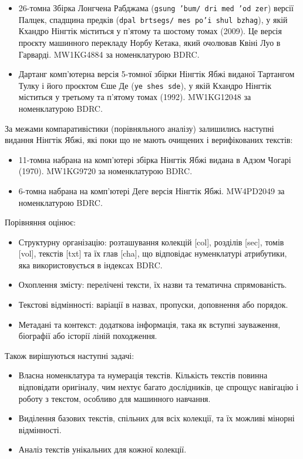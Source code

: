 \documentclass{article}
\begin{document}
\begingroup\raggedright
\begin{itemize}
\item 26-томна Збірка Лонгчена Рабджама (\texttt{gsung 'bum/ dri med 'od zer}) версії Палцек, спадщина предків (\texttt{dpal brtsegs/ mes po'i shul bzhag}),
      у якій Кхандро Нінгтік міститься у п'ятому та шостому томах (2009). Це версія проєкту машинного перекладу Норбу Кетака,
      який очолював Квіні Луо в Гарварді. MW1KG4884 за номенклатурою BDRC.
\item Дартанг комп'ютерна версія 5-томної збірки Нінгтік Ябжі виданої Тартангом Тулку і його проєктом Єше Де (\texttt{ye shes sde}),
      у якій Кхандро Нінгтік міститься у третьому та п'ятому томах (1992). MW1KG12048 за номенклатурою BDRC.
\end{itemize}
\endgroup

За межами компаративістики (порівняльного аналізу) залишились наступні видання Нінгтік Ябжі, які поки що не мають очищених і верифікованих текстів:

\begingroup\raggedright
\begin{itemize}
\item 11-томна набрана на комп'ютері збірка Нінгтік Ябжі видана в Адзом Чогарі (1970). MW1KG9720 за номенклатурою BDRC.
\item 6-томна набрана на комп'ютері Деге версія Нінгтік Ябжі. MW4PD2049 за номенклатурою BDRC.
\end{itemize}
\endgroup

\newpage
Порівняння оцінює:

\begingroup\raggedright
\begin{itemize}
\item Структурну організацію: розташування колекцій [col], розділів [sec], томів [vol], текстів [txt] та їх глав [cha],
      що відповідає нуменклатурі атрибутики, яка використовується в індексах BDRC.
\item Охоплення змісту: перелічені тексти, їх назви та тематична спрямованість.
\item Текстові відмінності: варіації в назвах, пропуски, доповнення або порядок.
\item Метадані та контекст: додаткова інформація, така як вступні зауваження, біографії або історії ліній походження.
\end{itemize}
\endgroup

Також вирішуються наступні задачі:

\begingroup\raggedright
\begin{itemize}
\item Власна номенклатура та нумерація текстів. Кількість текстів повинна відповідати оригіналу, чим нехтує багато дослідників,
      це спрощує навігацію і роботу з текстом, особливо для машинного навчання.
\item Виділення базових текстів, спільних для всіх колекції, та їх можливі мінорні відмінності.
\item Аналіз текстів унікальних для кожної колекції.
\end{itemize}
\endgroup
\end{document}
